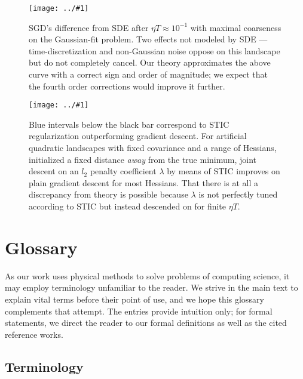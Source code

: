 \documentclass{article}
\theoremstyle{plain}
\theoremstyle{definition}
\newcommand{\plotmoow}[3]{\texttt{[image: ../\#1]}}
\begin{document}
    \begin{figure}[h] 
        \centering
        \plotmoow{plots/vs-sde}{0.98\columnwidth}{4.0cm}
        \caption{
            SGD's difference from SDE after $\eta T \approx
            10^{-1}$ with maximal coarseness on the Gaussian-fit problem.  
            Two effects not modeled by SDE --- time-discretization and
            non-Gaussian noise oppose on this landscape but do not
            completely cancel.  Our theory approximates the above curve with
            a correct sign and order of magnitude; we expect that the fourth
            order corrections would improve it further.
        }
        \label{fig:vssde}
    \end{figure}

    \begin{figure}[h] 
        \centering
        \plotmoow{plots/tak-reg}{0.98\columnwidth}{4.0cm}
        \caption{
            Blue intervals below the black bar correspond to STIC
            regularization outperforming gradient descent. For artificial
            quadratic landscapes with fixed covariance and a range of Hessians,
            initialized a fixed distance \emph{away} from the true minimum,
            joint descent on an $l_2$ penalty coefficient $\lambda$ by means of
            STIC improves on plain gradient descent for most Hessians.  That
            there is at all a discrepancy from theory is possible because
            $\lambda$ is not perfectly tuned according to STIC but instead
            descended on for finite $\eta T$.
        }
        \label{fig:takreg}
    \end{figure}

\section{Glossary}\label{sect:glossary}

    As our work uses physical methods to solve problems of computing science,
    it may employ terminology unfamiliar to the reader.  We strive in the main
    text to explain vital terms before their point of use, and we hope this
    glossary complements that attempt.  The entries provide intuition only;
    for formal statements, we direct the reader to our formal definitions as
    well as the cited reference works.

    \subsection{Terminology}
\end{document}
